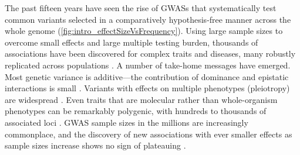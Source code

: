 \begin{outline}
The past fifteen years have seen the rise of \glspl{GWAS} that systematically test common variants selected in a comparatively hypothesis-free manner across the whole genome (\cref{fig:intro_effectSizeVsFrequency}).
Using large sample sizes to overcome small effects and large multiple testing burden, thousands of associations have been discovered for complex traits and diseases,
many robustly replicated across populations \autocite{visscher2012FiveYearsGWAS,visscher201710YearsGWAS}.
A number of take-home messages have emerged.
%
Most genetic variance is additive---the contribution of dominance and epistatic interactions is small \autocite{visscher2019Fisher1918Paper}.
Variants with effects on multiple phenotypes (pleiotropy) are widespread \autocite{visscher2012FiveYearsGWAS}.
Even traits that are molecular rather than whole-organism phenotypes can be remarkably polygenic, with hundreds to thousands of associated loci \autocite{sinnott-armstrong2020GWASThreeMolecular}.
\Gls{GWAS} sample sizes in the millions are increasingly commonplace,
and the discovery of new associations with ever smaller effects as sample sizes increase shows no sign of plateauing \autocite{tam2019BenefitsLimitationsGenomewide,crouch2020PolygenicInheritanceGWAS}.


\end{outline}
